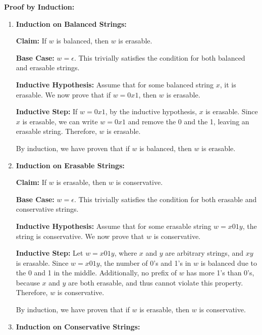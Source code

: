 \documentclass[9pt,tikz,border=2mm]{article}
\begin{document}
\begin{enumerate}
\begin{enumerate}
\begin{enumerate}
    \textbf{Proof by Induction:}

    \begin{enumerate}
        \item \textbf{Induction on Balanced Strings:}
        
        \textbf{Claim:} If \( w \) is balanced, then \( w \) is erasable.
        
        \textbf{Base Case:} \( w = \epsilon \). This trivially satisfies the condition for both balanced and erasable strings.
        
        \textbf{Inductive Hypothesis:} Assume that for some balanced string \( x \), it is erasable. We now prove that if \( w = 0x1 \), then \( w \) is erasable.
        
        \textbf{Inductive Step:} If \( w = 0x1 \), by the inductive hypothesis, \( x \) is erasable. Since \( x \) is erasable, we can write \( w = 0x1 \) and remove the 0 and the 1, leaving an erasable string. Therefore, \( w \) is erasable.
        
        By induction, we have proven that if \( w \) is balanced, then \( w \) is erasable.

        \item \textbf{Induction on Erasable Strings:}
        
        \textbf{Claim:} If \( w \) is erasable, then \( w \) is conservative.
        
        \textbf{Base Case:} \( w = \epsilon \). This trivially satisfies the condition for both erasable and conservative strings.
        
        \textbf{Inductive Hypothesis:} Assume that for some erasable string \( w = x01y \), the string is conservative. We now prove that \( w \) is conservative.
        
        \textbf{Inductive Step:} Let \( w = x01y \), where \( x \) and \( y \) are arbitrary strings, and \( xy \) is erasable. Since \( w = x01y \), the number of 0's and 1's in \( w \) is balanced due to the 0 and 1 in the middle. Additionally, no prefix of \( w \) has more 1's than 0's, because \( x \) and \( y \) are both erasable, and thus cannot violate this property. Therefore, \( w \) is conservative.
        
        By induction, we have proven that if \( w \) is erasable, then \( w \) is conservative.

        \item \textbf{Induction on Conservative Strings:}
        

\end{enumerate}
\end{enumerate}
\end{enumerate}
\end{enumerate}
\end{document}
